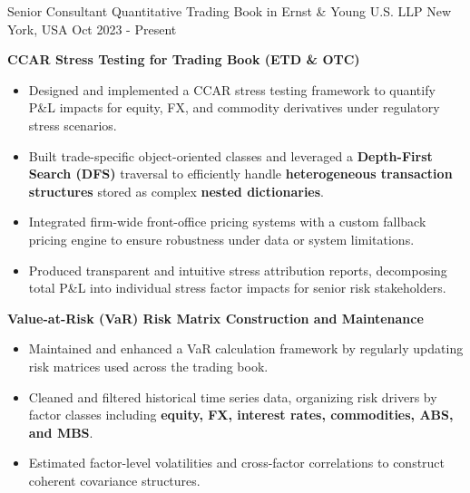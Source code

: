 

\begin{cventries}

\cventry
{Senior Consultant} %
{Quantitative Trading Book in Ernst \& Young U.S. LLP} %
{New York, USA} %
{Oct 2023 - Present} %
{
  \begin{cvitems}
    \item \textbf{CCAR Stress Testing for Trading Book (ETD \& OTC)}
    \begin{itemize}
      \item Designed and implemented a CCAR stress testing framework to quantify P\&L impacts for {equity, FX, and commodity} derivatives under regulatory stress scenarios.
      \item Built {trade-specific object-oriented classes} and leveraged a \textbf{Depth-First Search (DFS)} traversal to efficiently handle \textbf{heterogeneous transaction structures} stored as complex \textbf{nested dictionaries}.
      \item Integrated firm-wide front-office pricing systems with a {custom fallback pricing engine} to ensure robustness under data or system limitations.
      \item Produced transparent and intuitive {stress attribution reports}, decomposing total P\&L into individual stress factor impacts for senior risk stakeholders.
    \end{itemize}
    \item \textbf{Value-at-Risk (VaR) Risk Matrix Construction and Maintenance}
    \begin{itemize}
      \item Maintained and enhanced a VaR calculation framework by regularly updating {risk matrices} used across the trading book.
      \item {Cleaned and filtered historical time series data, organizing risk drivers by factor classes including \textbf{equity, FX, interest rates, commodities, ABS, and MBS}.}
      \item Estimated factor-level {volatilities and cross-factor correlations} to construct coherent covariance structures.

\end{itemize}
\end{cvitems}}
\end{cventries}
